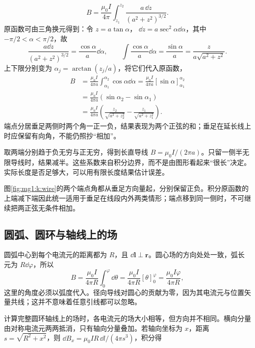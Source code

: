 \[
B=\frac{\mu_0 I}{4\pi}\int_{z_1}^{z_2}\frac{a\,\dd z}{(a^2+z^2)^{3/2}}.
\]
原函数可由三角换元得到：令 $z=a\tan\alpha$，
$\dd z=a\sec^2\alpha\dd\alpha$，其中 $-\pi/2<\alpha<\pi/2$，故
\[
 \frac{a\dd z}{(a^2+z^2)^{3/2}}=\frac{\cos\alpha}{a}\dd\alpha,
 \qquad
 \int\frac{\cos\alpha}{a}\dd\alpha
 =\frac{\sin\alpha}{a}
 =\frac{z}{a\sqrt{a^2+z^2}}.
\]
上下限分别变为 $\alpha_j=\arctan(z_j/a)$，将它们代入原函数，
\[
 \begin{aligned}
 B&=\frac{\mu_0I}{4\pi a}\int_{\alpha_1}^{\alpha_2}\cos\alpha\dd\alpha
 =\frac{\mu_0I}{4\pi a}[\sin\alpha]_{\alpha_1}^{\alpha_2}\\
 &=\frac{\mu_0I}{4\pi a}(\sin\alpha_2-\sin\alpha_1)\\
 &=\frac{\mu_0I}{4\pi a}
 \left(\frac{z_2}{\sqrt{a^2+z_2^2}}-\frac{z_1}{\sqrt{a^2+z_1^2}}\right).
 \end{aligned}
\]
端点分居垂足两侧时两个角一正一负，结果表现为两个正弦的和；垂足在延长线上时应保留有向角，不能仍照抄“相加”。


取两端分别趋于负无穷与正无穷，得到长直导线 $B=\mu_0I/(2\pi a)$。只留一侧半无限导线时，结果减半。这些系数来自积分边界，而不是由图形看起来“很长”决定。实际长度是否足够大，可以用有限长度结果估计误差。


图\ref{fig:mg1:k:wire}的两个端点角都从垂足方向量起，分别保留正负。积分原函数的上端减下端因此统一适用于垂足在线段内外两类情形；端点移到同一侧时，不可继续把两正弦无条件相加。


\subsection{圆弧、圆环与轴线上的场}
圆弧中心到每个电流元的距离都为 $R$，且 $\dd\bm l\perp\bm r$。圆心场的方向处处一致，弧长元为 $R\dd\varphi$，所以
\[
 B=\frac{\mu_0I}{4\pi R}\int_0^\varphi\dd\theta
 =\frac{\mu_0I}{4\pi R}[\theta]_0^\varphi
 =\frac{\mu_0I\varphi}{4\pi R},
\]这里的角度必须以弧度代入。径向导线对圆心的贡献为零，因为其电流元与位置矢量共线；这并不意味着任意引线都可以忽略。


计算完整圆环轴线上的场时，各电流元的场大小相等，但方向并不相同。横向分量由对称电流元两两抵消，只有轴向分量叠加。若轴向坐标为 $x$，距离 $s=\sqrt{R^2+x^2}$，则 $\dd B_x=\mu_0I R\,\dd l/(4\pi s^3)$，积分得

